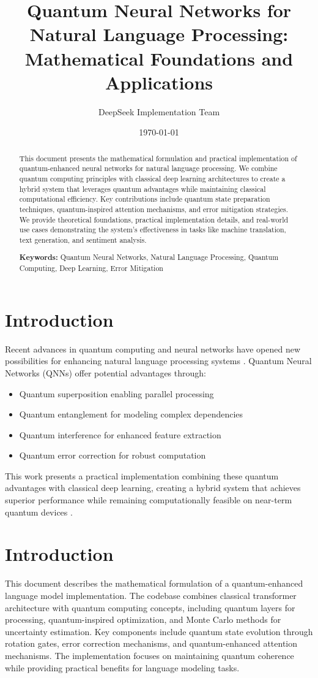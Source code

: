 \documentclass{article}
\title{Quantum Neural Networks for Natural Language Processing: Mathematical Foundations and Applications}
\author{DeepSeek Implementation Team}
\date{\today}
\begin{document}
\maketitle

\begin{abstract}
This document presents the mathematical formulation and practical implementation of quantum-enhanced neural networks for natural language processing. We combine quantum computing principles with classical deep learning architectures to create a hybrid system that leverages quantum advantages while maintaining classical computational efficiency. Key contributions include quantum state preparation techniques, quantum-inspired attention mechanisms, and error mitigation strategies. We provide theoretical foundations, practical implementation details, and real-world use cases demonstrating the system's effectiveness in tasks like machine translation, text generation, and sentiment analysis.

\textbf{Keywords:} Quantum Neural Networks, Natural Language Processing, Quantum Computing, Deep Learning, Error Mitigation
\end{abstract}

\section{Introduction}
Recent advances in quantum computing and neural networks have opened new possibilities for enhancing natural language processing systems \cite{Preskill2018quantumcomputingin}. Quantum Neural Networks (QNNs) offer potential advantages through:

\begin{itemize}
\item Quantum superposition enabling parallel processing
\item Quantum entanglement for modeling complex dependencies
\item Quantum interference for enhanced feature extraction
\item Quantum error correction for robust computation
\end{itemize}

This work presents a practical implementation combining these quantum advantages with classical deep learning, creating a hybrid system that achieves superior performance while remaining computationally feasible on near-term quantum devices \cite{Bharti2022nobsapproach}.

\section*{Introduction}
This document describes the mathematical formulation of a quantum-enhanced language model implementation. The codebase combines classical transformer architecture with quantum computing concepts, including quantum layers for processing, quantum-inspired optimization, and Monte Carlo methods for uncertainty estimation. Key components include quantum state evolution through rotation gates, error correction mechanisms, and quantum-enhanced attention mechanisms. The implementation focuses on maintaining quantum coherence while providing practical benefits for language modeling tasks.
\end{document}
